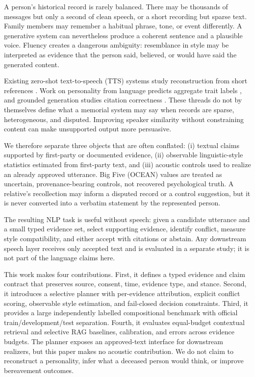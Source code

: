 \documentclass[11pt,a4paper]{article}
\begin{document}
A person's historical record is rarely balanced.  There may be thousands of
messages but only a second of clean speech, or a short recording but sparse
text.  Family members may remember a habitual phrase, tone, or event
differently.  A generative system can nevertheless produce a coherent sentence
and a plausible voice.  Fluency creates a dangerous ambiguity: resemblance in
style may be interpreted as evidence that the person said, believed, or would
have said the generated content.

Existing zero-shot text-to-speech (TTS) systems study reconstruction from short
references \citep{chen-etal-2025-f5,peng-etal-2024-voicecraft}.  Work on
personality from language predicts aggregate trait labels
\citep{mairesse2007linguistic,schwartz2013personality}, and grounded generation
studies citation correctness \citep{gao-etal-2023-enabling}.  These threads do
not by themselves define what a memorial system may say when records are
sparse, heterogeneous, and disputed.  Improving speaker similarity without
constraining content can make unsupported output more persuasive.

We therefore separate three objects that are often conflated: (i) textual
claims supported by first-party or documented evidence, (ii) observable
linguistic-style statistics estimated from first-party text, and (iii) acoustic
controls used to realize an already approved utterance.  Big Five (OCEAN)
values are treated as uncertain, provenance-bearing controls, not recovered
psychological truth.  A relative's recollection may inform a disputed record or
a control suggestion, but it is never converted into a verbatim statement by
the represented person.

  The resulting NLP task is useful without speech: given a candidate utterance
  and a small typed evidence set, select supporting evidence, identify conflict,
  measure style compatibility, and either accept with citations or abstain.  Any
  downstream speech layer receives only accepted text and is evaluated in a
  separate study; it is not part of the language claims here.

  This work makes four contributions.  First, it defines a typed evidence and
claim contract that preserves source, consent, time, evidence type, and stance.
Second, it introduces a selective planner with per-evidence attribution,
explicit conflict scoring, observable style estimation, and fail-closed
decision constraints.  Third, it provides a large independently labelled
compositional benchmark with official train/development/test separation.
Fourth, it evaluates equal-budget contextual retrieval and selective RAG
baselines, calibration, and errors across evidence budgets.  The planner
  exposes an approved-text interface for downstream realizers, but this paper
  makes no acoustic contribution.  We do not claim to
reconstruct a personality, infer what a deceased person would think, or improve
bereavement outcomes.
\end{document}
